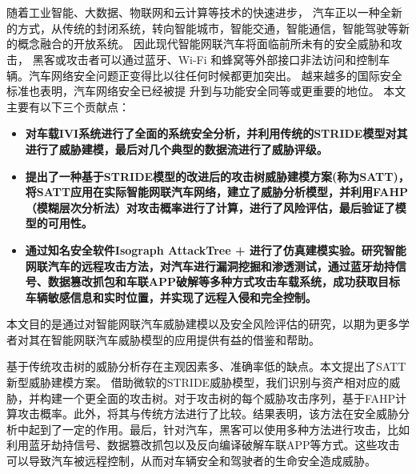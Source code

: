 \vspace{-2.5cm}
\chapter*{\xiaosan {}}
\hspace{-0.5cm}

随着工业智能、大数据、物联网和云计算等技术的快速进步，
汽车正以一种全新的方式，从传统的封闭系统，转向智能城市，智能交通，智能通信，智能驾驶等新的概念融合的开放系统。
因此现代智能网联汽车将面临前所未有的安全威胁和攻击，
黑客或攻击者可以通过蓝牙、Wi-Fi 和蜂窝等外部接口非法访问和控制车辆。汽车网络安全问题正变得比以往任何时候都更加突出。
越来越多的国际安全标准也表明，汽车网络安全已经被提
升到与功能安全同等或更重要的地位。
本文主要有以下三个贡献点：
\begin{itemize}
    \item \textbf{对车载IVI系统进行了全面的系统安全分析，并利用传统的STRIDE模型对其进行了威胁建模，最后对几个典型的数据流进行了威胁评级。}
    \item \textbf{提出了一种基于STRIDE模型的改进后的攻击树威胁建模方案(称为SATT)，将SATT应用在实际智能网联汽车网络，建立了威胁分析模型，并利用FAHP（模糊层次分析法）对攻击概率进行了计算，进行了风险评估，最后验证了模型的可用性。}
    \item \textbf{通过知名安全软件Isograph AttackTree + 进行了仿真建模实验。研究智能网联汽车的远程攻击方法，对汽车进行漏洞挖掘和渗透测试，通过蓝牙劫持信号、数据篡改抓包和车联APP破解等多种方式攻击车载系统，成功获取目标车辆敏感信息和实时位置，并实现了远程入侵和完全控制。}    
\end{itemize}

本文目的是通过对智能网联汽车威胁建模以及安全风险评估的研究，以期为更多学者对其在智能网联汽车威胁模型的应用提供有益的借鉴和帮助。

基于传统攻击树的威胁分析存在主观因素多、准确率低的缺点。本文提出了SATT新型威胁建模方案。
借助微软的STRIDE威胁模型，我们识别与资产相对应的威胁，并构建一个更全面的攻击树。对于攻击树的每个威胁攻击序列，基于FAHP计算攻击概率。此外，将其与传统方法进行了比较。结果表明，该方法在安全威胁分析中起到了一定的作用。最后，针对汽车，黑客可以使用多种方法进行攻击，比如利用蓝牙劫持信号、数据篡改抓包以及反向编译破解车联APP等方式。这些攻击可以导致汽车被远程控制，从而对车辆安全和驾驶者的生命安全造成威胁。
\newline
{} 